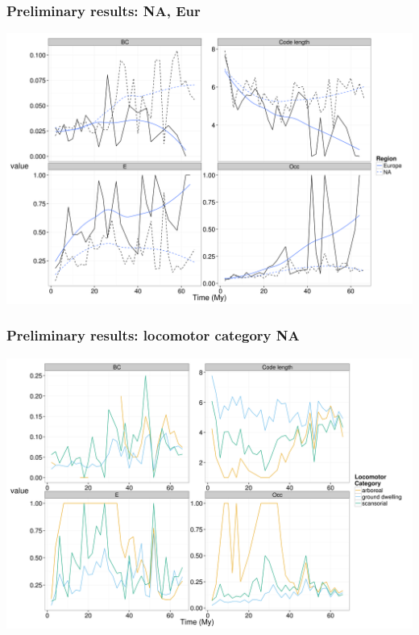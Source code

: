 \documentclass{beamer}
\begin{document}
\begin{frame}
  \frametitle{Preliminary results: NA, Eur}

  \begin{center}
    \includegraphics[height = 0.8\textheight, width = \textwidth, keepaspectratio = true]{figure/gen_bin}
  \end{center}
\end{frame}

\begin{frame}
  \frametitle{Preliminary results: locomotor category NA}

  \begin{center}
    \includegraphics[height = 0.8\textheight, width = \textwidth, keepaspectratio = true]{figure/na_lf}
  \end{center}
\end{frame}
\end{document}
